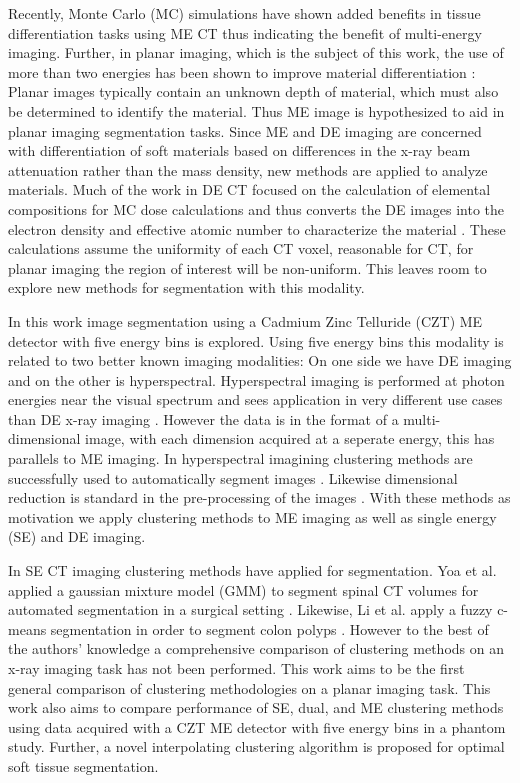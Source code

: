 \documentclass[a4paper,11pt]{article}
\begin{document}
Recently, Monte Carlo (MC) simulations have shown added benefits in tissue differentiation tasks using ME CT \cite{Lalonde2016ACT} thus indicating the benefit of multi-energy imaging. Further, in planar imaging, which is the subject of this work, the use of more than two energies has been shown to improve material differentiation \cite{OConnell2019OptimalDetector}: Planar images typically contain an unknown depth of material, which must also be determined to identify the material. Thus ME image is hypothesized to aid in planar imaging segmentation tasks. Since ME and DE imaging are concerned with differentiation of soft materials based on differences in the x-ray beam attenuation rather than the mass density, new methods are applied to analyze materials. Much of the work in DE CT focused on the calculation of elemental compositions for MC dose calculations and thus converts the DE images into the electron density and effective atomic number to characterize the material \cite{Bazalova2008Dual-energyCalculations,Landry2013DerivingCoefficients,Saito2017ABody}. These calculations assume the uniformity of each CT voxel, reasonable for CT, for planar imaging the region of interest will be non-uniform. This leaves room to explore new methods for segmentation with this modality.

In this work image segmentation using a Cadmium Zinc Telluride (CZT) ME detector with five energy bins is explored. Using five energy bins this modality is related to two better known imaging modalities: On one side we have DE imaging and on the other is hyperspectral. Hyperspectral imaging is performed at photon energies near the visual spectrum and sees application in very different use cases than DE x-ray imaging \cite{Lu2014MedicalReview.,Khan2018ModernReview}. However the data is in the format of a multi-dimensional image, with each dimension acquired at a seperate energy, this has parallels to ME imaging. In hyperspectral imagining clustering methods are successfully used to automatically segment images \cite{Murphy2018UnsupervisedDiffusion,Gillis2012HyperspectralGraphs,Noe2001PartialClustering}. Likewise dimensional reduction is standard in the pre-processing of the images \cite{Mahesh2015HyperspectralMaterials}. With these methods as motivation we apply clustering methods to ME imaging as well as single energy (SE) and DE imaging.

In SE CT imaging clustering methods have applied for segmentation. Yoa et al. applied a gaussian mixture model (GMM) to segment spinal CT volumes for automated segmentation in a surgical setting \cite{Yao2004ColonicModels}. Likewise, Li et al. apply a fuzzy c-means segmentation in order to segment colon polyps \cite{Li2008ImprovedRadiography}. However to the best of the authors' knowledge a comprehensive comparison of clustering methods on an x-ray imaging task has not been performed. This work aims to be the first general comparison of clustering methodologies on a planar imaging task. This work also aims to compare performance of SE, dual, and ME clustering methods using data acquired with a CZT ME detector with five energy bins in a phantom study. Further, a novel interpolating clustering algorithm is proposed for optimal soft tissue segmentation.
\end{document}
